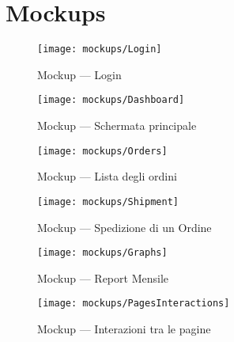 \chapter{Mockups}

\begin{figure}[H]
  \centering
  \begin{minipage}{0.4\textwidth}
    \centering
    \texttt{[image: mockups/Login]}
    \caption{Mockup --- Login}
  \end{minipage}\hfill
  \begin{minipage}{0.4\textwidth}
    \centering
    \texttt{[image: mockups/Dashboard]}
    \caption{Mockup --- Schermata principale}
  \end{minipage}
\end{figure}

\begin{figure}[H]
  \centering
  \begin{minipage}{0.4\textwidth}
    \centering
    \texttt{[image: mockups/Orders]}
    \caption{Mockup --- Lista degli ordini}
  \end{minipage}\hfill
  \begin{minipage}{0.4\textwidth}
    \centering
    \texttt{[image: mockups/Shipment]}
    \caption{Mockup --- Spedizione di un Ordine}
  \end{minipage}
\end{figure}

\begin{figure}[H]
  \centering
  \texttt{[image: mockups/Graphs]}
  \caption{Mockup --- Report Mensile}
\end{figure}

\newpage

\begin{figure}[H]
  \centering
  \texttt{[image: mockups/PagesInteractions]}
  \caption{Mockup --- Interazioni tra le pagine}
\end{figure}